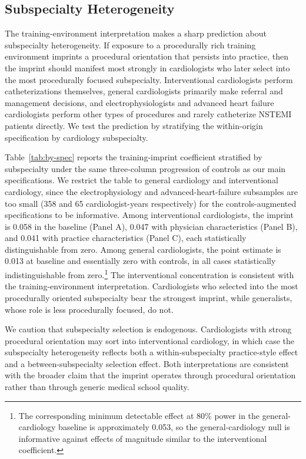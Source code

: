 \documentclass[12pt]{article}
\begin{document}
\subsection{Subspecialty Heterogeneity}\label{sec:imprint-spec}

The training-environment interpretation makes a sharp prediction about subspecialty heterogeneity. If exposure to a procedurally rich training environment imprints a procedural orientation that persists into practice, then the imprint should manifest most strongly in cardiologists who later select into the most procedurally focused subspecialty. Interventional cardiologists perform catheterizations themselves, general cardiologists primarily make referral and management decisions, and electrophysiologists and advanced heart failure cardiologists perform other types of procedures and rarely catheterize NSTEMI patients directly. We test the prediction by stratifying the within-origin specification by cardiology subspecialty.

Table~\ref{tab:by-spec} reports the training-imprint coefficient stratified by subspecialty under the same three-column progression of controls as our main specifications. We restrict the table to general cardiology and interventional cardiology, since the electrophysiology and advanced-heart-failure subsamples are too small (358 and 65 cardiologist-years respectively) for the controls-augmented specifications to be informative. Among interventional cardiologists, the imprint is 0.058 in the baseline (Panel A), 0.047 with physician characteristics (Panel B), and 0.041 with practice characteristics (Panel C), each statistically distinguishable from zero. Among general cardiologists, the point estimate is 0.013 at baseline and essentially zero with controls, in all cases statistically indistinguishable from zero.\footnote{The corresponding minimum detectable effect at 80\% power in the general-cardiology baseline is approximately 0.053, so the general-cardiology null is informative against effects of magnitude similar to the interventional coefficient.} The interventional concentration is consistent with the training-environment interpretation. Cardiologists who selected into the most procedurally oriented subspecialty bear the strongest imprint, while generalists, whose role is less procedurally focused, do not.

We caution that subspecialty selection is endogenous. Cardiologists with strong procedural orientation may sort into interventional cardiology, in which case the subspecialty heterogeneity reflects both a within-subspecialty practice-style effect and a between-subspecialty selection effect. Both interpretations are consistent with the broader claim that the imprint operates through procedural orientation rather than through generic medical school quality.
\end{document}
